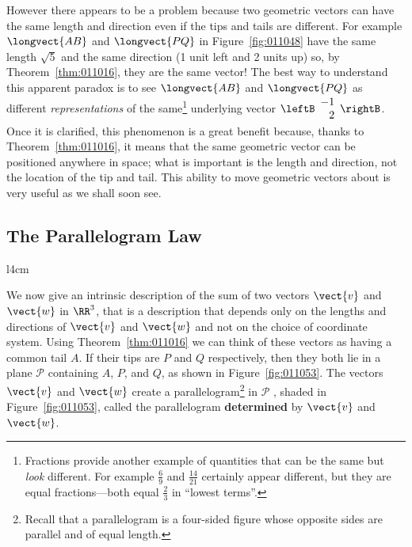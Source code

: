 However there appears to be a problem because two geometric vectors can have the same length and direction even if the tips and tails are different. For example $\longvect{AB}$ and $\longvect{PQ}$ in Figure~\ref{fig:011048} have the same length $\sqrt{5}$ and the same direction (1 unit left and 2 units up) so, by Theorem~\ref{thm:011016}, they are the same vector! The best way to understand this apparent paradox is to see $\longvect{AB}$ and $\longvect{PQ}$ as different \textit{representations} of the same\footnote{Fractions provide another example of quantities that can be the same but \textit{look} different. For example $\frac{6}{9}$ and $\frac{14}{21}$  certainly appear different, but they are equal fractions---both equal $\frac{2}{3}$ in ``lowest terms''.} underlying vector $\leftB
 \begin{array}{r}
 -1 \\
 2  
 \end{array}
 \rightB$. Once it is clarified, this phenomenon is a great benefit because, thanks to Theorem~\ref{thm:011016},
 it means that the same geometric vector can be positioned anywhere in 
space; what is important is the length and direction, not the location 
of the tip and tail. This ability to move geometric vectors about is 
very useful as we shall soon see.


\subsection*{The Parallelogram Law}

\begin{wrapfigure}[7]{l}{4cm} 
	\centering
	
	\caption{\label{fig:011053}}
\end{wrapfigure}

We now give an intrinsic description of the sum of two vectors $\vect{v}$ and $\vect{w}$ in $\RR^3$, that is a description that depends only on the lengths and directions of $\vect{v}$ and $\vect{w}$ and not on the choice of coordinate system. Using Theorem~\ref{thm:011016} we can think of these vectors as having a common tail $A$. If their tips are $P$ and $Q$ respectively, then they both lie in a plane $\mathcal{P}$
 containing $A$, $P$, and $Q$, as shown in Figure~\ref{fig:011053}. The vectors $\vect{v}$ and $\vect{w}$ create a parallelogram\footnote{Recall that a parallelogram is a four-sided figure whose opposite sides are parallel and of equal length.}
 in $\mathcal{P}$
, shaded in Figure~\ref{fig:011053}, called the parallelogram \textbf{determined} by $\vect{v}$ and $\vect{w}$.

